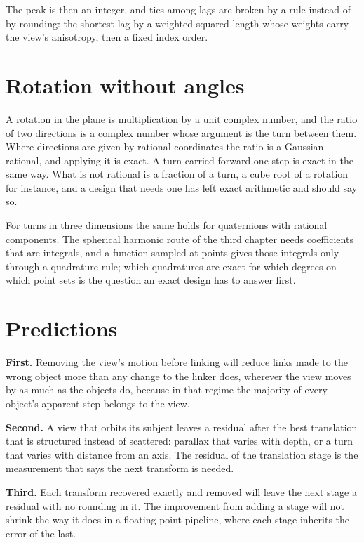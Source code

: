 The peak is then an integer, and ties among lags are broken by a rule instead of by rounding: the shortest
lag by a weighted squared length whose weights carry the view's anisotropy, then a fixed index order.

\section{Rotation without angles}

A rotation in the plane is multiplication by a unit complex number, and the ratio of two directions
is a complex number whose argument is the turn between them. Where directions are given by rational
coordinates the ratio is a Gaussian rational, and applying it is exact. A turn carried forward one
step is exact in the same way. What is not rational is a fraction of a turn, a cube root of a
rotation for instance, and a design that needs one has left exact arithmetic and should say so.

For turns in three dimensions the same holds for quaternions with rational components. The spherical
harmonic route of the third chapter needs coefficients that are integrals, and a function sampled at
points gives those integrals only through a quadrature rule; which quadratures are exact for which
degrees on which point sets is the question an exact design has to answer first.

\section{Predictions}

\textbf{First.} Removing the view's motion before linking will reduce links made to the wrong object
more than any change to the linker does, wherever the view moves by as much as the objects do,
because in that regime the majority of every object's apparent step belongs to the view.

\textbf{Second.} A view that orbits its subject leaves a residual after the best translation that is
structured instead of scattered: parallax that varies with depth, or a turn that varies with distance from
an axis. The residual of the translation stage is the measurement that says the next transform is
needed.

\textbf{Third.} Each transform recovered exactly and removed will leave the next stage a residual with
no rounding in it. The improvement from adding a stage will not shrink the way it does in a floating
point pipeline, where each stage inherits the error of the last.
